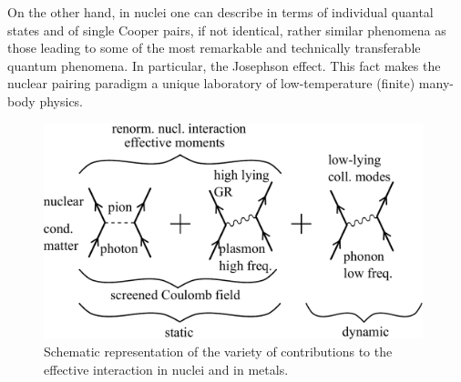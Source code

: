 On the other hand, in nuclei one can describe in terms of individual quantal states and of single Cooper pairs, if not identical, rather similar phenomena as those leading to some of the most remarkable and technically transferable quantum phenomena. In particular, the Josephson effect. This fact makes the nuclear pairing paradigm a unique laboratory of low-temperature (finite) many-body physics. 
   \begin{figure}
   	\centerline{\includegraphics*[width=11cm,angle=0	]{nutshell/figs/fig3A4}}
   	\caption{ Schematic representation of the variety of contributions to the effective interaction in nuclei and in metals.}\label{fig3.A.4}
   \end{figure}



